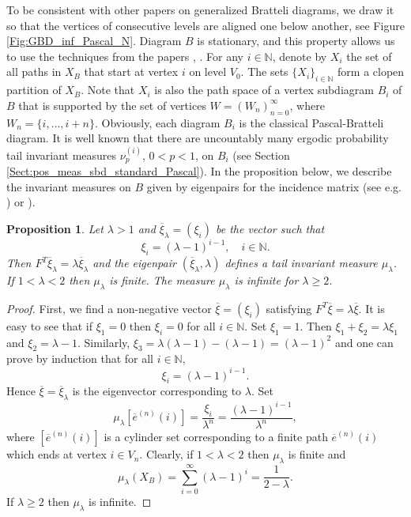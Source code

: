 \documentclass[11pt, twoside]{amsart}
\theoremstyle{definition}
\theoremstyle{remark}
\theoremstyle{plain}
\newtheorem{prop}[definition]{Proposition}
\def\ov{\overline}
\numberwithin{equation}{section}
\begin{document}
To be consistent with other papers on generalized Bratteli diagrams, we draw it so that the vertices of consecutive levels are aligned one below another, see Figure \ref{Fig:GBD_inf_Pascal_N}. Diagram $B$ is stationary, and this property allows us to use the techniques from the papers \cite{BezuglyiJorgensenKarpelSanadhya2023}, \cite{BezuglyiKarpelKwiatkowski2024}. For any $i \in \mathbb{N}$, denote by $X_i$ the set of all paths in $X_B$ that start at vertex $i$ on level $V_0$. The sets $\{X_i\}_{i \in \mathbb{N}}$ form a clopen partition of $X_B$. Note that $X_i$ is also the path space of a vertex subdiagram $B_i$ of $B$ that is supported by the set of vertices $W = (W_n)_{n = 0}^{\infty}$, where $W_n = \{i, \ldots, i + n\}$. Obviously, each diagram $B_i$ is the classical Pascal-Bratteli diagram. 
It is well known
that there are uncountably many ergodic probability tail invariant measures $\nu_p^{(i)}$, $0 < p < 1$, on $B_i$ (see Section \ref{Sect:pos_meas_sbd_standard_Pascal}). 
In the proposition below, we describe the invariant measures on $B$ given by eigenpairs for the incidence matrix (see e.g. \cite[Theorem 2.3.2]{BezuglyiJorgensen2022}) or \cite[Theorem 6.6]{BezuglyiJorgensenKarpelSanadhya2023}).

\begin{prop}
    Let $\lambda > 1$ and $\ov \xi_{\lambda} = (\xi_i)$ be the vector such that
    $$
    \xi_i = (\lambda - 1)^{i-1}, \quad i \in \mathbb{N}.
    $$
Then $F^T\ov \xi_{\lambda} = \lambda \ov\xi_{\lambda}$ and the eigenpair $(\ov \xi_{\lambda}, \lambda)$ defines a tail invariant measure $\mu_{\lambda}$. If $1 < \lambda < 2$ then $\mu_{\lambda}$ is finite. 
The measure $\mu_{\lambda}$ is infinite for $\lambda \geq 2$.
\end{prop}


\begin{proof}
    First, we find a non-negative vector $\ov \xi = (\xi_i)$ satisfying $F^T \ov \xi = \lambda \ov \xi$. It is easy to see that if $\xi_1 = 0$ then $\xi_i = 0$ for all $i \in \mathbb{N}$. Set $\xi_1 = 1$. Then $\xi_1 + \xi_2 = \lambda \xi_1$ and $\xi_2 = \lambda - 1$. Similarly, $\xi_3 = \lambda(\lambda - 1) - (\lambda - 1) = (\lambda - 1)^2$ and one can prove by induction that for all $i \in \mathbb{N}$,
    $$
    \xi_i = (\lambda - 1)^{i - 1}.
    $$
    Hence $\ov \xi = \ov \xi_{\lambda}$ is the eigenvector corresponding to $\lambda$. Set
    $$
    \mu_{\lambda}[\ov e^{(n)}(i)] = \frac{\xi_i}{\lambda^n} = \frac{(\lambda - 1)^{i-1}}{\lambda^n},
    $$
    where $[\ov e^{(n)}(i)]$ is a cylinder set corresponding to a finite path $\ov e^{(n)}(i)$ which ends at vertex $i \in V_n$. Clearly, if $1 < \lambda < 2$ then $\mu_{\lambda}$ is finite and
    $$
    \mu_{\lambda}(X_B) = \sum_{i = 0}^{\infty} (\lambda - 1)^i = \frac{1}{2 - \lambda}.
    $$
    If $\lambda \geq 2$ then $\mu_{\lambda}$ is infinite.
\end{proof}
\end{document}
